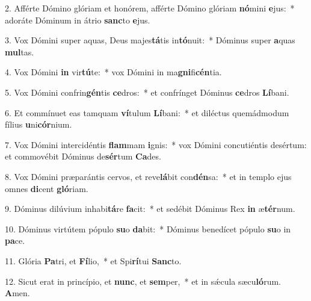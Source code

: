 2. Afférte Dómino glóriam et honórem, afférte Dómino glóriam \textbf{nó}mini \textbf{e}jus:~*  adoráte Dóminum in átrio \textbf{sanc}to \textbf{e}jus.\

3. Vox Dómini super aquas, Deus majes\textbf{tá}tis in\textbf{tó}nuit:~*  Dóminus super \textbf{a}quas \textbf{mul}tas.\

4. Vox Dómini \textbf{in} vir\textbf{tú}te:~*  vox Dómini in ma\textbf{gni}fi\textbf{cén}tia.\

5. Vox Dómini confrin\textbf{gén}tis \textbf{ce}dros:~*  et confrínget Dóminus \textbf{ce}dros \textbf{Lí}bani.\

6. Et commínuet eas tamquam \textbf{ví}tulum \textbf{Lí}bani:~*  et diléctus quemádmodum fílius \textbf{u}ni\textbf{cór}nium.\

7. Vox Dómini intercidéntis \textbf{flam}mam \textbf{i}gnis:~*  vox Dómini concutiéntis desértum: et commovébit Dóminus de\textbf{sér}tum \textbf{Ca}des.\

8. Vox Dómini præparántis cervos, et reve\textbf{lá}bit con\textbf{dén}sa:~*  et in templo ejus omnes \textbf{di}cent \textbf{gló}riam.\

9. Dóminus dilúvium inhabi\textbf{tá}re \textbf{fa}cit:~*  et sedébit Dóminus Rex \textbf{in} æ\textbf{tér}num.\

10. Dóminus virtútem pópulo \textbf{su}o \textbf{da}bit:~*  Dóminus benedícet pópulo \textbf{su}o in \textbf{pa}ce.\

11. Glória \textbf{Pa}tri, et \textbf{Fí}lio,~*  et Spi\textbf{rí}tui \textbf{Sanc}to.\

12. Sicut erat in princípio, et \textbf{nunc}, et \textbf{sem}per,~*  et in sǽcula sæcu\textbf{ló}rum. \textbf{A}men.\

